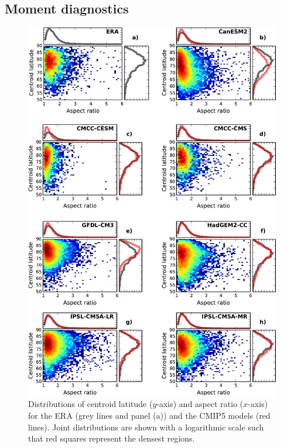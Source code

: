 \subsection{Moment diagnostics}
\label{sec:moment-diagnostics}

\begin{figure}[htbp]
 \centering
 \noindent\includegraphics[width=\textwidth]{figures/chapter-models/moments_stats1.pdf}
 \caption[Distributions of moment diagnostics for the CMIP5
 models]{Distributions of centroid latitude ($y$-axis) and aspect ratio
   ($x$-axis) for the ERA (grey lines and panel (a)) and the CMIP5 models (red
   lines). Joint distributions are shown with a logarithmic scale such that red
   squares represent the densest regions.}
 \label{fig:cmip5_moments_stats}
\end{figure}

